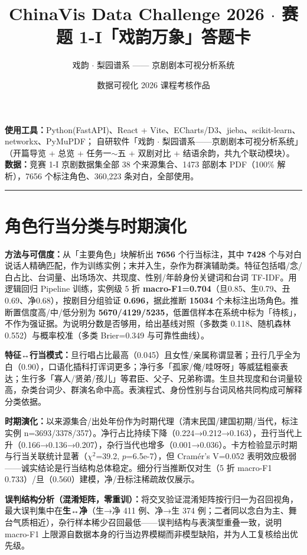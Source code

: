 \documentclass[11pt]{article}
\title{\textbf{ChinaVis Data Challenge 2026 $\cdot$ 赛题 1-I「戏韵万象」答题卡}}
\author{戏韵 $\cdot$ 梨园谱系 —— 京剧剧本可视分析系统}
\date{数据可视化 2026 课程考核作品}
\begin{document}
\maketitle

\noindent\textbf{使用工具：}Python(FastAPI)、React + Vite、ECharts/D3、jieba、scikit-learn、networkx、PyMuPDF；
自研软件「戏韵 $\cdot$ 梨园谱系——京剧剧本可视分析系统」（开篇导览 + 总览 + 任务一$\sim$五 + 双剧对比 + 结语余韵，共九个联动模块）。
\textbf{数据：}竞赛 1-I 京剧数据集全部 38 个来源集合、1473 部剧本 PDF（100\% 解析），7656 个标注角色、360{,}223 条对白，全部使用。

\vspace{0.4em}\hrule\vspace{0.6em}

\section{角色行当分类与时期演化}
\textbf{方法与可信度：}从「主要角色」块解析出 \textbf{7656} 个行当标注，其中 \textbf{7428} 个与对白说话人精确匹配，作为训练实例；末并入生，杂作为群演辅助类。特征包括唱/念/白占比、台词量、出场场次、共现度、性别/年龄身份关键词和台词 TF-IDF。用逻辑回归 Pipeline 训练，实例级 5 折 \textbf{macro-F1=0.704}（旦0.85、生0.79、丑0.69、净0.68），按剧目分组验证 \textbf{0.696}，据此推断 \textbf{15034} 个未标注出场角色。推断置信度高/中/低分别为 \textbf{5670/4129/5235}，低置信样本在系统中标为「待核」，不作为强证据。为说明分数是否够用，给出基线对照（多数类 0.118、随机森林 0.552）与概率校准（多类 Brier=0.349 与可靠性曲线）。

\textbf{特征↔行当模式：}旦行唱占比最高（0.045）且女性/亲属称谓显著；丑行几乎全为白（0.90），口语化插科打诨词更多；净行多「孤家/俺/哇呀呀」等威猛粗豪表达；生行多「寡人/贤弟/孩儿」等君臣、父子、兄弟称谓。生旦共现度和台词量较高，杂类台词少、群演名命中高。表演程式、身份性别与台词风格共同构成可解释分类依据。

\textbf{时期演化：}以来源集合/出处年份作为时期代理（清末民国/建国初期/当代，标注实例 n=3693/3378/357）。净行占比持续下降（0.224→0.212→0.163），丑行当代上升（0.166→0.136→0.207），杂行当代也增多（0.001→0.036）。卡方检验显示时期与行当关联统计显著（$\chi^2$=39.2, $p$=6.5e-7），但 Cramér's V=0.052 表明效应极弱——诚实结论是行当结构总体稳定。细分行当推断仅对生（5 折 macro-F1 0.733）/旦（0.560）建模，净/丑标注稀疏故仅展示。

\textbf{误判结构分析（混淆矩阵，零重训）：}将交叉验证混淆矩阵按行归一为召回视角，最大误判集中在\textbf{生↔净}（生→净 411 例、净→生 374 例；二者同以念白为主、舞台气质相近），杂行样本稀少召回最低——误判结构与表演型重叠一致，说明 macro-F1 上限源自数据本身的行当边界模糊而非模型缺陷，并为人工复核给出优先级。
\end{document}
